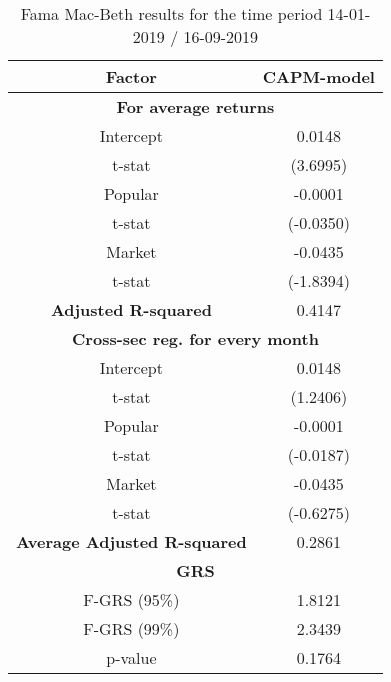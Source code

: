 \begin{table}[h!]
	\centering
	\captionsetup{skip=0.5\baselineskip}
	\caption{Fama Mac-Beth results for the time period 14-01-2019 / 16-09-2019}
	\begin{tabular}{|c|c|}
		\hline
		\textbf{Factor} & \textbf{CAPM-model} \\ \hline
		\multicolumn{2}{|c|}{\textbf{For average returns}} \\ \hline
		Intercept & 0.0148 \\ 
		t-stat & (3.6995) \\ \hline
		Popular & -0.0001 \\ 
		t-stat & (-0.0350)\\ \hline
		Market & -0.0435 \\
		t-stat & (-1.8394)\\ \hline
		\textbf{Adjusted R-squared} & 0.4147 \\ \hline
		\multicolumn{2}{|c|}{\textbf{Cross-sec reg. for every month}} \\ \hline
		Intercept & 0.0148 \\ 
		t-stat & (1.2406) \\ \hline
		Popular & -0.0001 \\ 
		t-stat & (-0.0187)\\ \hline
		Market & -0.0435 \\
		t-stat & (-0.6275)\\ \hline
		\textbf{Average Adjusted R-squared} & 0.2861 \\ \hline
		\multicolumn{2}{|c|}{\textbf{GRS}} \\ \hline
		F-GRS (95\%) & 1.8121 \\ \hline
		F-GRS (99\%) & 2.3439 \\ \hline
		p-value & 0.1764 \\ \hline
	\end{tabular}
\end{table}

